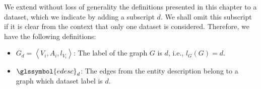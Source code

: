 We extend without loss of generality the definitions presented in this chapter to a dataset, which we indicate by adding a subscript $d$. We shall omit this subscript if it is clear from the context that only one dataset is considered. Therefore, we have the following definitions:

\begin{itemize}
\item $G_d = \left\langle V_i, A_i, l_{V_i} \right\rangle$: The label of the graph $G$ is $d$, i.e., $l_G(G) = d$.
\item $\glssymbol{edesc}_d$: The edges from the entity description belong to a graph which dataset label is $d$.
\end{itemize}
